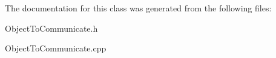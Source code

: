 The documentation for this class was generated from the following files\-:\begin{DoxyCompactItemize}
\item 
Object\-To\-Communicate.\-h\item 
Object\-To\-Communicate.\-cpp\end{DoxyCompactItemize}
